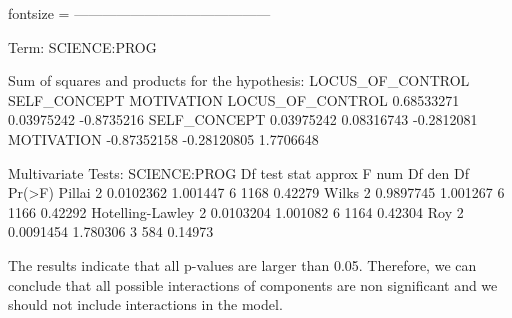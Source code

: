 \documentclass{article}
\begin{document}
\begin{enumerate}[leftmargin = 0 em, label = \arabic*., font = \bfseries]
\begin{enumerate}
\begin{rcode*}{fontsize = \footnotesize}
------------------------------------------
 
Term: SCIENCE:PROG 

Sum of squares and products for the hypothesis:
                 LOCUS_OF_CONTROL SELF_CONCEPT MOTIVATION
LOCUS_OF_CONTROL       0.68533271   0.03975242 -0.8735216
SELF_CONCEPT           0.03975242   0.08316743 -0.2812081
MOTIVATION            -0.87352158  -0.28120805  1.7706648

Multivariate Tests: SCIENCE:PROG
                 Df test stat approx F num Df den Df  Pr(>F)
Pillai            2 0.0102362 1.001447      6   1168 0.42279
Wilks             2 0.9897745 1.001267      6   1166 0.42292
Hotelling-Lawley  2 0.0103204 1.001082      6   1164 0.42304
Roy               2 0.0091454 1.780306      3    584 0.14973
\end{rcode*}

The results indicate that all p-values are larger than 0.05. Therefore, we can conclude that all possible interactions of components are non significant and we should not include interactions in the model.
	\end{enumerate}

 	\end{enumerate}









	
	
	
	
\end{document}
